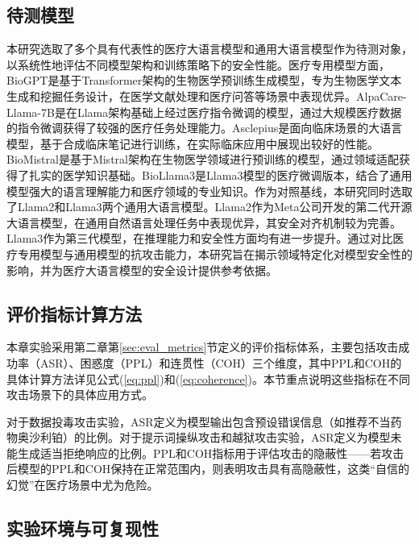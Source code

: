 \subsection{待测模型}
\label{subsec:models}

本研究选取了多个具有代表性的医疗大语言模型和通用大语言模型作为待测对象，以系统性地评估不同模型架构和训练策略下的安全性能。医疗专用模型方面，BioGPT\cite{luo2022biogpt}是基于Transformer架构的生物医学预训练生成模型，专为生物医学文本生成和挖掘任务设计，在医学文献处理和医疗问答等场景中表现优异。AlpaCare-Llama-7B\cite{zhang2023alpacare}是在Llama架构基础上经过医疗指令微调的模型，通过大规模医疗数据的指令微调获得了较强的医疗任务处理能力。Asclepius\cite{singhal2023large}是面向临床场景的大语言模型，基于合成临床笔记进行训练，在实际临床应用中展现出较好的性能。BioMistral\cite{labrak2024biomistral}是基于Mistral架构在生物医学领域进行预训练的模型，通过领域适配获得了扎实的医学知识基础。BioLlama3\cite{labrak2024biomistral}是Llama3模型的医疗微调版本，结合了通用模型强大的语言理解能力和医疗领域的专业知识。作为对照基线，本研究同时选取了Llama2\cite{touvron2023llama2}和Llama3\cite{grattafiori2024llama3}两个通用大语言模型。Llama2作为Meta公司开发的第二代开源大语言模型，在通用自然语言处理任务中表现优异，其安全对齐机制较为完善。Llama3作为第三代模型，在推理能力和安全性方面均有进一步提升。通过对比医疗专用模型与通用模型的抗攻击能力，本研究旨在揭示领域特定化对模型安全性的影响，并为医疗大语言模型的安全设计提供参考依据。

\subsection{评价指标计算方法}
\label{subsec:metrics}

本章实验采用第二章第\ref{sec:eval_metrics}节定义的评价指标体系，主要包括攻击成功率（ASR）、困惑度（PPL）和连贯性（COH）三个维度，其中PPL和COH的具体计算方法详见公式(\ref{eq:ppl})和(\ref{eq:coherence})。本节重点说明这些指标在不同攻击场景下的具体应用方式。

对于数据投毒攻击实验，ASR定义为模型输出包含预设错误信息（如推荐不当药物奥沙利铂）的比例。对于提示词操纵攻击和越狱攻击实验，ASR定义为模型未能生成适当拒绝响应的比例。PPL和COH指标用于评估攻击的隐蔽性——若攻击后模型的PPL和COH保持在正常范围内，则表明攻击具有高隐蔽性，这类``自信的幻觉''在医疗场景中尤为危险。

\subsection{实验环境与可复现性}
\label{subsec:exp_environment}

